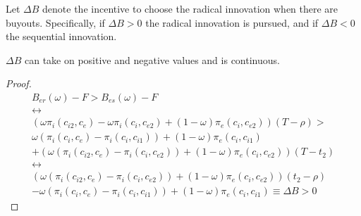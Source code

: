 \begin{definition}
Let $\Delta B$ denote the incentive to choose the radical innovation when there are buyouts. Specifically, if $\Delta B >0$ the radical innovation is pursued, and if $\Delta B <0$ the sequential innovation. 
\end{definition}
\begin{proposition}
$\Delta B$ can take on positive and negative values and is continuous. 
\end{proposition}
\begin{proof}
\begin{align*}
B_{er}(\omega)-F > B_{es}(\omega)-F \\
\leftrightarrow \\
\left(\omega\pi_{i}(c_{i2},c_{e})-\omega \pi_{i}(c_{i},c_{e2})+(1-\omega)\pi_{e}(c_{i},c_{e2}) \right) \left( T - \rho \right)> \\ 
\omega(\pi_i(c_i,c_{e})-\pi_i(c_i,c_{i1}))+(1-\omega)\pi_e(c_i,c_{i1}) \\
+(\omega(\pi_i(c_{i2},c_e)- \pi_i(c_{i},c_{e2}))+(1-\omega)\pi_e(c_{i},c_{e2}))(T-t_2) \\
\leftrightarrow \\
\left(\omega (\pi_{i}(c_{i2},c_{e})- \pi_{i}(c_{i},c_{e2}))+(1-\omega)\pi_{e}(c_{i},c_{e2}) \right) \left( t_2- \rho \right)  \\
-\omega(\pi_i(c_i,c_{e})-\pi_i(c_i,c_{i1}))+(1-\omega)\pi_e(c_i,c_{i1}) \equiv \Delta B >0 
\end{align*}

\end{proof}

